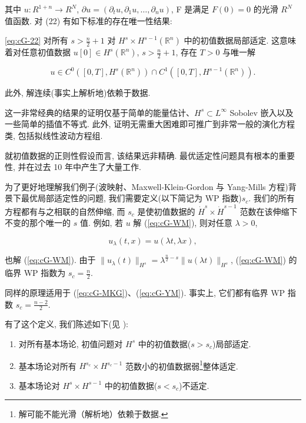 其中 $u : R^{1+n} \to R^{N}$, $\partial u = (\partial_{t}u,  \partial_{1}u,  \ldots,  \partial_{n}u)$, F 是满足 $F(0) = 0$ 的光滑 $R^{N}$ 值函数. 对 (22) 有如下标准的存在唯一性结果:

\begin{theorem}[经典局部存在性]\label{thm:cG-2.2}
\eqref{eq:cG-22} 对所有 $s > \frac{n}{2} + 1$ 对 $H^{s} \times H^{s - 1}(\mathbb{R}^{n})$ 中的初值数据局部适定. 这意味着对任意初值数据 $u[0] \in H^{s}(\mathbb{R}^{n})$, $s > \frac{n}{2} + 1$, 存在 $T > 0$ 与唯一解

\[
u \in C ^ {0} ([ 0,  T ],  H ^ {s} (\mathbb {R} ^ {n})) \cap C ^ {1} ([ 0,  T ],  H ^ {s - 1} (\mathbb {R} ^ {n})).
\]

此外, 解连续(事实上解析地)依赖于数据. 
\end{theorem}

\begin{remark}\label{rem:cG-2.3}
这一非常经典的结果的证明仅基于简单的能量估计、$H^s \subset L^{\infty}$ Sobolev 嵌入以及一些简单的插值不等式. 此外, 证明无需重大困难即可推广到非常一般的演化方程类, 包括拟线性波动方程组. 
\end{remark}

\begin{remark}\label{rem:cG-2.4}
就初值数据的正则性假设而言, 该结果远非精确. 最优适定性问题具有根本的重要性, 并在过去 10 年中产生了大量工作. 
\end{remark}

为了更好地理解我们例子(波映射、Maxwell-Klein-Gordon 与 Yang-Mills 方程)背景下最优局部适定性的问题, 我们需要定义(以下简记为 WP 指数)$s_{c}$. 我们的所有方程都有与之相联的自然伸缩, 而 $s_{c}$ 是使初值数据的 $\dot{H}^{s} \times \dot{H}^{s-1}$ 范数在该伸缩下不变的那个唯一的 $s$ 值. 例如, 若 $u$ 解 (\ref{eq:cG-WM}), 则对任意 $\lambda > 0$, 

\[
u _ {\lambda} (t,  x) = u (\lambda t,  \lambda x), 
\]

也解 (\ref{eq:cG-WM}). 由于 $\| u_{\lambda}(t) \|_{H^s} = \lambda^{\frac{n}{2} - s} \| u(\lambda t) \|_{H^s}$, (\ref{eq:cG-WM}) 的临界 WP 指数为 $s_c = \frac{n}{2}$. 

同样的原理适用于 (\ref{eq:cG-MKG})、(\ref{eq:cG-YM}). 事实上, 它们都有临界 WP 指数 $s_c = \frac{n - 2}{2}$. 

有了这个定义, 我们陈述如下(见 \cite{gfref29}):


\begin{enumerate}
\def\labelenumi{\arabic{enumi}.}
\item 对所有基本场论, 初值问题对 $H^{s}$ 中的初值数据($s > s_{c}$)局部适定. 
\item 基本场论对所有 $H^{s_{c}} \times H^{s_{c}-1}$ 范数小的初值数据弱\footnote{解可能不能光滑（解析地）依赖于数据.}整体适定. 
\item 基本场论对 $H^{s} \times H^{s-1}$ 中的初值数据($s < s_{c}$)不适定. 
\end{enumerate}

